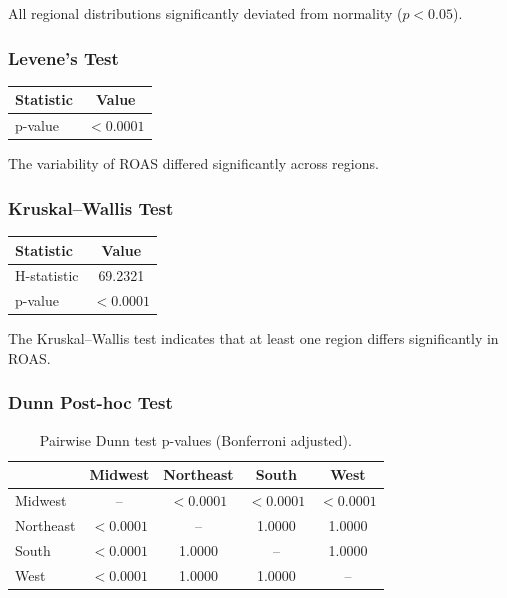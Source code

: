 All regional distributions significantly deviated from normality ($p<0.05$).

\vspace{0.3cm}

\subsubsection{Levene's Test}

\begin{table}[H]
	\centering
	\begin{tabular}{lc}
		\toprule
		Statistic & Value \\
		\midrule
		p-value & $<0.0001$ \\
		\bottomrule
	\end{tabular}
\end{table}

The variability of ROAS differed significantly across regions.

\vspace{0.3cm}

\subsubsection{Kruskal--Wallis Test}

\begin{table}[H]
	\centering
	\begin{tabular}{lc}
		\toprule
		Statistic & Value \\
		\midrule
		H-statistic & 69.2321 \\
		p-value & $<0.0001$ \\
		\bottomrule
	\end{tabular}
\end{table}

The Kruskal--Wallis test indicates that at least one region differs significantly in ROAS.

\vspace{0.3cm}

\subsubsection{Dunn Post-hoc Test}

\begin{table}[H]
	\centering
	\caption{Pairwise Dunn test p-values (Bonferroni adjusted).}
	\begin{tabular}{lcccc}
		\toprule
		& Midwest & Northeast & South & West \\
		\midrule
		Midwest & -- & $<0.0001$ & $<0.0001$ & $<0.0001$ \\
		Northeast & $<0.0001$ & -- & 1.0000 & 1.0000 \\
		South & $<0.0001$ & 1.0000 & -- & 1.0000 \\
		West & $<0.0001$ & 1.0000 & 1.0000 & -- \\
		\bottomrule
	\end{tabular}
\end{table}


